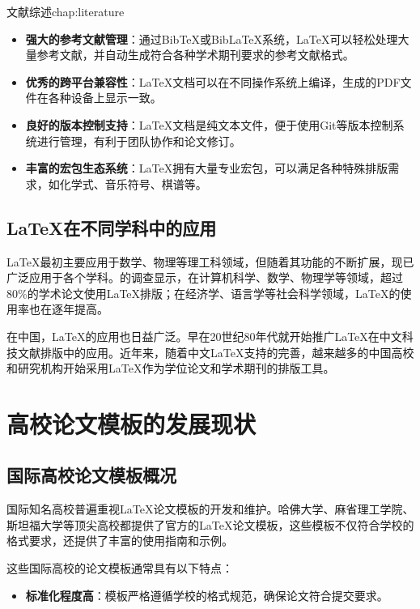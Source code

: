 \begin{cuzchapter}{文献综述}{chap:literature}
\begin{itemize}
		\item \textbf{强大的参考文献管理}：通过BibTeX或BibLaTeX系统，\LaTeX{}可以轻松处理大量参考文献，并自动生成符合各种学术期刊要求的参考文献格式。
		
		\item \textbf{优秀的跨平台兼容性}：\LaTeX{}文档可以在不同操作系统上编译，生成的PDF文件在各种设备上显示一致。
		
		\item \textbf{良好的版本控制支持}：\LaTeX{}文档是纯文本文件，便于使用Git等版本控制系统进行管理，有利于团队协作和论文修订。
		
		\item \textbf{丰富的宏包生态系统}：\LaTeX{}拥有大量专业宏包，可以满足各种特殊排版需求，如化学式、音乐符号、棋谱等。
	\end{itemize}
	
	\subsection{LaTeX在不同学科中的应用}
	
	\LaTeX{}最初主要应用于数学、物理等理工科领域，但随着其功能的不断扩展，现已广泛应用于各个学科。\citet{hls2012jinji}的调查显示，在计算机科学、数学、物理学等领域，超过80\%的学术论文使用\LaTeX{}排版；在经济学、语言学等社会科学领域，\LaTeX{}的使用率也在逐年提高。
	
	在中国，\LaTeX{}的应用也日益广泛。\citet{chen1980zhongguo}早在20世纪80年代就开始推广\LaTeX{}在中文科技文献排版中的应用。近年来，随着中文\LaTeX{}支持的完善，越来越多的中国高校和研究机构开始采用\LaTeX{}作为学位论文和学术期刊的排版工具。
	
	\section{高校论文模板的发展现状}\label{sec:template-status}
	
	\subsection{国际高校论文模板概况}
	
	国际知名高校普遍重视\LaTeX{}论文模板的开发和维护。哈佛大学、麻省理工学院、斯坦福大学等顶尖高校都提供了官方的\LaTeX{}论文模板，这些模板不仅符合学校的格式要求，还提供了丰富的使用指南和示例。
	
	这些国际高校的论文模板通常具有以下特点：
	
	\begin{itemize}
		\item \textbf{标准化程度高}：模板严格遵循学校的格式规范，确保论文符合提交要求。
		

\end{itemize}
\end{cuzchapter}
